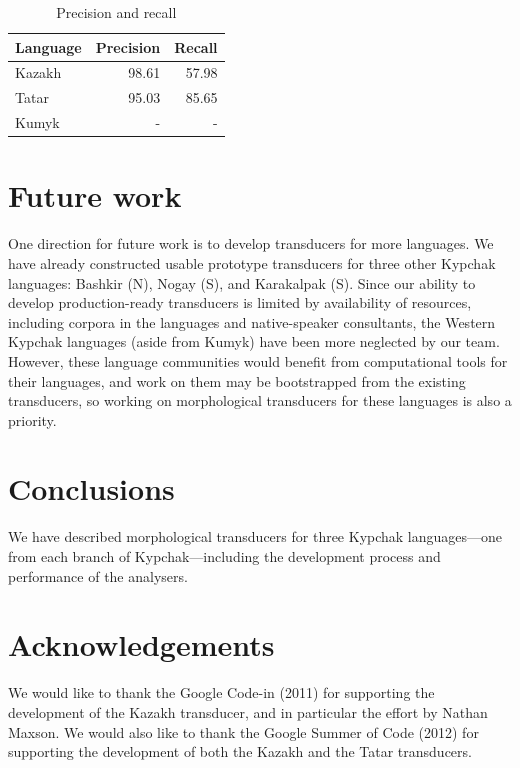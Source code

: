 \documentclass[a4paper,11pt,twocolumn]{article}
\begin{document}

\begin{table}
\begin{center}
	\begin{tabular}{lrr}
	\toprule
		\textbf{Language} & \textbf{Precision} & \textbf{Recall} \\
	\midrule
		Kazakh & 98.61 &  57.98 \\
		Tatar & 95.03 & 85.65 \\
		Kumyk & - & - \\
	\bottomrule
	\end{tabular}
	\caption{Precision and recall}
	\label{table:precrecall}
\end{center}
\end{table}


\section{Future work}


One direction for future work is to develop transducers for more languages.  We have already constructed usable prototype transducers for three other Kypchak languages: Bashkir (N), Nogay (S), and Karakalpak (S).  Since our ability to develop production-ready transducers is limited by availability of resources, including corpora in the languages and native-speaker consultants, the Western Kypchak languages (aside from Kumyk) have been more neglected by our team.  However, these language communities would benefit from computational tools for their languages, and work on them may be bootstrapped from the existing transducers, so working on morphological transducers for these languages is also a priority.

\section{Conclusions}

We have described morphological transducers for three Kypchak languages---one from each branch of Kypchak---including the development process and performance of the analysers.

\section*{Acknowledgements}

We would like to thank the Google Code-in (2011) for supporting the development 
of the Kazakh transducer, and in particular the effort by Nathan Maxson. We 
would also like to thank the Google Summer of Code (2012) for supporting the 
development of both the Kazakh and the Tatar transducers. 



\end{document}
